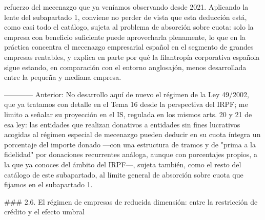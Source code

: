 \documentclass[10pt,a4paper]{article}
\begin{document}
refuerzo del mecenazgo que ya veníamos observando desde 2021. Aplicando la lente del subapartado 1, conviene no perder de vista que esta deducción está, como casi todo el catálogo, sujeta al problema de absorción sobre cuota: solo la empresa con beneficio suficiente puede aprovecharla plenamente, lo que en la práctica concentra el mecenazgo empresarial español en el segmento de grandes empresas rentables, y explica en parte por qué la filantropía corporativa española sigue estando, en comparación con el entorno anglosajón, menos desarrollada entre la pequeña y mediana empresa.

------------ Anterior:
No desarrollo aquí de nuevo el régimen de la Ley 49/2002, que ya tratamos con detalle en el Tema 16 desde la perspectiva del IRPF; me limito a señalar su proyección en el IS, regulada en los mismos arts. 20 y 21 de esa ley: las entidades que realizan donativos a entidades sin fines lucrativos acogidas al régimen especial de mecenazgo pueden deducir en su cuota íntegra un porcentaje del importe donado —con una estructura de tramos y de "prima a la fidelidad" por donaciones recurrentes análoga, aunque con porcentajes propios, a la que ya conoces del ámbito del IRPF—, sujeta también, como el resto del catálogo de este subapartado, al límite general de absorción sobre cuota que fijamos en el subapartado 1.

### 2.6. El régimen de empresas de reducida dimensión: entre la restricción de crédito y el efecto umbral
\end{document}
